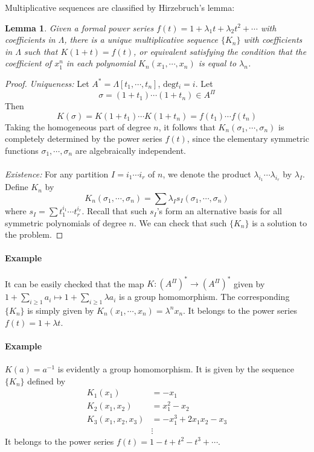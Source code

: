 \documentclass[12pt]{article}
\theoremstyle{plain}
\newtheorem{lemma}[equation]{Lemma}
\theoremstyle{definition}
\renewcommand{\deg}{\mathrm{deg}}
\newcommand{\<}{\langle}
\renewcommand{\>}{\rangle}
\begin{document}
Multiplicative sequences are classified by Hirzebruch's lemma: 
\begin{lemma}
Given a formal power series $f(t) = 1 + \lambda_1 t + \lambda_2 t^2 + \cdots$ with coefficients in $\Lambda$, there is a unique multiplicative sequence $\{ K_n \}$ with coefficients in $\Lambda$ such that $K(1 + t) = f(t)$, or equivalent satisfying the condition that the coefficient of $x_1^n$ in each polynomial $K_n(x_1, \cdots, x_n)$ is equal to $\lambda_n$. 
\end{lemma}
\begin{proof}
\textit{Uniqueness: }Let $A^* = \Lambda[t_1, \cdots, t_n]$, $\deg t_i = i$. Let $$\sigma = (1 + t_1) \cdots (1 + t_n) \in A^\Pi$$ Then 
$$ K(\sigma) = K(1 + t_1) \cdots K(1 + t_n ) = f(t_1) \cdots f(t_n) $$
Taking the homogeneous part of degree $n$, it follows that $K_n(\sigma_1, \cdots, \sigma_n)$ is completely determined by the power series $f(t)$, since the elementary symmetric functions $\sigma_1, \cdots, \sigma_n$ are algebraically independent. \\\\
\textit{Existence: }For any partition $I = i_1 \cdots i_r$ of $n$, we denote the product $\lambda_{i_1} \cdots \lambda_{i_r}$ by $\lambda_I$. Define $K_n$ by 
$$ K_n(\sigma_1, \cdots, \sigma_n) = \sum \lambda_I s_I(\sigma_1, \cdots, \sigma_n)$$ 
where $s_I = \sum t_1^{i_1} \cdots t_r^{i_r}$. Recall that such $s_I$'s form an alternative basis for all symmetric polynomials of degree $n$. 
We can check that such $\{ K_n \}$ is a solution to the problem. 
\end{proof}

\paragraph{Example} It can be easily checked that the map $K : (A^\Pi)^* \to (A^\Pi)^*$ given by $1 + \sum_{i \ge 1} a_i \mapsto 1 + \sum_{i \ge 1} \lambda a_i$ is a group homomorphism. The corresponding $\{ K_n \}$ is simply given by $K_n(x_1, \cdots, x_n) = \lambda^n x_n$. It belongs to the power series $f(t) = 1 + \lambda t$. 

\paragraph{Example} $K(a) = a^{-1}$ is evidently a group homomorphism. It is given by the sequence $\{ K_n \}$ defined by 
\begin{align*}
K_1(x_1) &=  - x_1 \\
K_2(x_1, x_2) &= x_1^2 - x_2 \\
K_3(x_1, x_2, x_3) &= - x_1^3 + 2 x_1 x_2 - x_3 \\
&\vdots
\end{align*}
It belongs to the power series $f(t) = 1 - t + t^2 - t^3 + \cdots $. 
\end{document}
